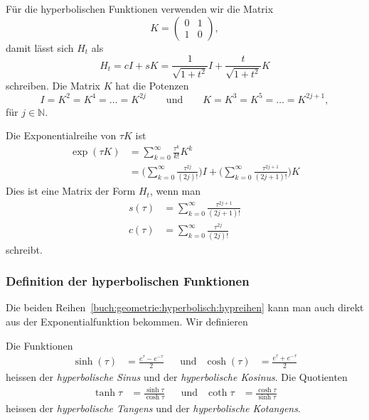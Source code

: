 Für die hyperbolischen Funktionen verwenden wir die Matrix
\begin{equation}
K
=
\begin{pmatrix}
0&1\\
1&0
\end{pmatrix},
\label{buch:geometrie:hyperbolisch:matrixK}
\end{equation}
damit lässt sich $H_t$ als
\[
H_t
=
c I + s K
=
\frac{1}{\sqrt{1+t^2}} I + \frac{t}{\sqrt{1+t^2}} K
\]
schreiben.
Die Matrix $K$ hat die Potenzen
\[
I
=
K^2 =  K^4 = \dots = K^{2j}
\qquad\text{und}\qquad
K
= K^3 = K^5 = \dots = K^{2j+1},
\]
für $j\in\mathbb{N}$.

Die Exponentialreihe von $\tau K$ ist
\begin{align*}
\exp(\tau K)
&=
\sum_{k=0}^\infty \frac{\tau^k}{k!} K^k
\\
&=
\biggl(
\sum_{k=0}^\infty \frac{\tau^{2j}}{(2j)!}
\biggr)
I
+
\biggl(
\sum_{k=0}^\infty \frac{\tau^{2j+1}}{(2j+1)!}
\biggr)
K
\end{align*}
Dies ist eine Matrix der Form $H_t$, wenn man
\begin{equation}
\begin{aligned}
s(\tau)&=
\sum_{k=0}^\infty \frac{\tau^{2j+1}}{(2j+1)!}
\\
c(\tau)&=
\sum_{k=0}^\infty \frac{\tau^{2j}}{(2j)!}
\end{aligned}
\label{buch:geometrie:hyperbolisch:hypreihen}
\end{equation}
schreibt.

\subsubsection{Definition der hyperbolischen Funktionen}
Die beiden Reihen~\eqref{buch:geometrie:hyperbolisch:hypreihen}
kann man auch direkt aus der Exponentialfunktion bekommen.
Wir definieren

\begin{definition}
\label{buch:geometrie:hyperbolisch:def}
Die Funktionen
\[
\begin{aligned}
\sinh(\tau)&=\frac{e^\tau-e^{-\tau}}2
&&\text{und}&
\cosh(\tau)&=\frac{e^\tau+e^{-\tau}}2
\end{aligned}
\]
heissen der {\em hyperbolische Sinus} und der {\em hyperbolische Kosinus}.
Die Quotienten
\[
\begin{aligned}
\tanh\tau &= \frac{\sinh \tau}{\cosh \tau}
&&\text{und}&
\coth\tau &= \frac{\cosh \tau}{\sinh \tau}
\end{aligned}
\]
heissen der {\em hyperbolische Tangens} und der {\em hyperbolische Kotangens}.
\end{definition}

